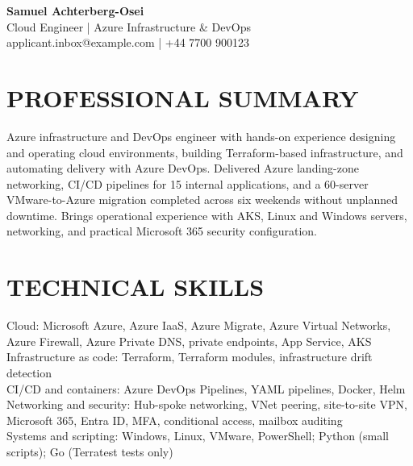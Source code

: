 \documentclass[11pt,a4paper]{article}
\begin{document}
\begin{center}
{\Huge\bfseries\color{primarycolor} Samuel Achterberg-Osei}\\[0.35em]
{\large\color{accentcolor} Cloud Engineer | Azure Infrastructure \& DevOps}\\[0.25em]
applicant.inbox@example.com | +44 7700 900123
\end{center}

\section*{PROFESSIONAL SUMMARY}
Azure infrastructure and DevOps engineer with hands-on experience designing and operating cloud environments, building Terraform-based infrastructure, and automating delivery with Azure DevOps. Delivered Azure landing-zone networking, CI/CD pipelines for 15 internal applications, and a 60-server VMware-to-Azure migration completed across six weekends without unplanned downtime. Brings operational experience with AKS, Linux and Windows servers, networking, and practical Microsoft 365 security configuration.

\section*{TECHNICAL SKILLS}
Cloud: Microsoft Azure, Azure IaaS, Azure Migrate, Azure Virtual Networks, Azure Firewall, Azure Private DNS, private endpoints, App Service, AKS\\
Infrastructure as code: Terraform, Terraform modules, infrastructure drift detection\\
CI/CD and containers: Azure DevOps Pipelines, YAML pipelines, Docker, Helm\\
Networking and security: Hub-spoke networking, VNet peering, site-to-site VPN, Microsoft 365, Entra ID, MFA, conditional access, mailbox auditing\\
Systems and scripting: Windows, Linux, VMware, PowerShell; Python (small scripts); Go (Terratest tests only)
\end{document}
